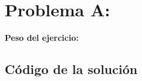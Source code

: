 \newpage{}
\section{Problema A: }
\textbf{Peso del ejercicio: }

\newpage
\subsection{Código de la solución}
\lstset{inputencoding=utf8/latin1}


